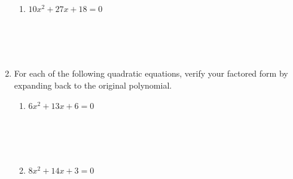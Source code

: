 \documentclass[12pt]{article}
\begin{document}
\begin{enumerate}
\begin{enumerate}
        \item $10x^2 + 27x + 18 = 0$
        \[
        \begin{array}{c}
        \\ \\ \\ \\ \\ \\ \\ \\ \\ \\ \\ \\
        \end{array}
        \]
    \end{enumerate}

    \item For each of the following quadratic equations, verify your factored form by expanding back to the original polynomial.
    \begin{enumerate}
        \item $6x^2 + 13x + 6 = 0$
        \[
        \begin{array}{c}
        \\ \\ \\ \\ \\ \\ \\ \\ \\ \\ \\ \\
        \end{array}
        \]

        \item $8x^2 + 14x + 3 = 0$
        \[
        \begin{array}{c}
        \\ \\ \\ \\ \\ \\ \\ \\ \\ \\ \\ \\
        \end{array}
        \]


\end{enumerate}
\end{enumerate}
\end{document}
